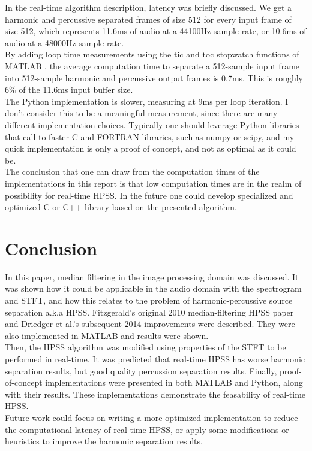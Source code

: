 \documentclass[letter,12pt]{article}
\begin{document}
In the real-time algorithm description, latency was briefly discussed. We get a harmonic and percussive separated frames of size 512 for every input frame of size 512, which represents 11.6ms of audio at a 44100Hz sample rate, or 10.6ms of audio at a 48000Hz sample rate.\\

By adding loop time measurements using the tic and toc stopwatch functions of MATLAB \cite{tictoc}, the average computation time to separate a 512-sample input frame into 512-sample harmonic and percussive output frames is 0.7ms. This is roughly 6\% of the 11.6ms input buffer size.\\

The Python implementation is slower, measuring at 9ms per loop iteration. I don't consider this to be a meaningful measurement, since there are many different implementation choices. Typically one should leverage Python libraries that call to faster C and FORTRAN libraries, such as numpy or scipy, and my quick implementation is only a proof of concept, and not as optimal as it could be.\\

The conclusion that one can draw from the computation times of the implementations in this report is that low computation times are in the realm of possibility for real-time HPSS. In the future one could develop specialized and optimized C or C++ library based on the presented algorithm.

\section{Conclusion}

In this paper, median filtering in the image processing domain was discussed. It was shown how it could be applicable in the audio domain with the spectrogram and STFT, and how this relates to the problem of harmonic-percussive source separation a.k.a HPSS. Fitzgerald's original 2010 median-filtering HPSS paper \cite{fitzgerald} and Driedger et al.'s subsequent 2014 improvements \cite{driedger} were described. They were also implemented in MATLAB and results were shown.\\

Then, the HPSS algorithm was modified using properties of the STFT to be performed in real-time. It was predicted that real-time HPSS has worse harmonic separation results, but good quality percussion separation results. Finally, proof-of-concept implementations were presented in both MATLAB and Python, along with their results. These implementations demonstrate the feasability of real-time HPSS.\\

Future work could focus on writing a more optimized implementation to reduce the computational latency of real-time HPSS, or apply some modifications or heuristics to improve the harmonic separation results.

\vfill
\clearpage %

\nocite{*}
\printbibheading[title={References},heading=bibnumbered]
\printbibliography[heading=none]

\vfill
\clearpage %
\end{document}
